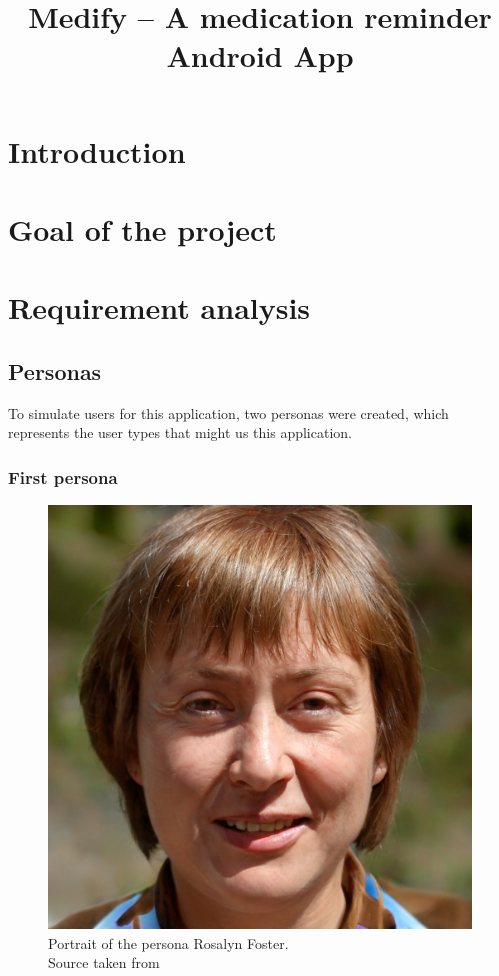 \documentclass[conference]{IEEEtran}
\begin{document}
\title{Medify -- A medication reminder Android App}

\author{
}

\maketitle

\begin{abstract}
\lipsum[1][1-4]
\end{abstract}

\section{Introduction}

\section{Goal of the project}

\section{Requirement analysis}

\subsection{Personas}
To simulate users for this application, two personas were created, which represents the user types
that might us this application.

\subsubsection{First persona} \hfill
\begin{figure}[htbp]
	\centerline{\includegraphics[width=.5\linewidth]{images/persona01.jpg}}
	\caption[Portrait of the persona Rosalyn Foster; Source taken from \cite{b1}]
	{Portrait of the persona Rosalyn Foster.\\ Source taken from \cite{b1}\endtabular}
	\label{fig:persona01}
\end{figure}
\end{document}
